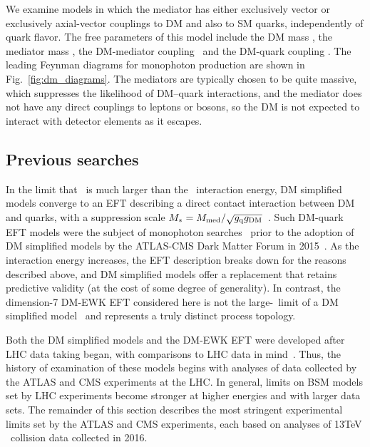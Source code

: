 We examine models in which the mediator has either exclusively vector or exclusively axial-vector couplings to DM and also to SM quarks, independently
of quark flavor. The free parameters of this model include
the DM mass \mdm, the mediator mass \mmed, the DM-mediator coupling \gdm\ and the DM-quark coupling \gq.
The leading Feynman diagrams for monophoton production are shown in Fig.~\ref{fig:dm_diagrams}. The mediators are typically chosen to be quite massive,
which suppresses the likelihood of DM--quark interactions, and the mediator does not have any direct couplings to leptons or bosons,
so the DM is not expected to interact with detector elements as it escapes.

\subsection{Previous searches} \label{sec:introduction_dm_previous_searches}
In the limit that \mmed\ is much larger than the \Pq\Paq\ interaction energy, DM simplified models converge to an EFT describing a direct contact
interaction between DM and quarks, with a suppression scale $M_\mathrm{*} = M_\mathrm{med}/\sqrt{g_\mathrm{q}g_\mathrm{DM}}$~\cite{ref:1603.04156}.
Such DM-quark EFT models were the subject of monophoton searches~\cite{ref:j.physletb.2016.01.057, ref:PhysRevD.91.012008} prior to the adoption of
DM simplified models by the ATLAS-CMS Dark Matter Forum in 2015~\cite{ref:1507.00966}.
As the interaction energy increases, the EFT description breaks down for the reasons described above, and DM simplified models
offer a replacement that retains predictive validity (at the cost of some degree of generality).
In contrast, the dimension-7 DM-EWK EFT considered here is not the large-\mmed\ limit of a DM simplified model~\cite{ref:1507.00966} and represents a truly distinct
process topology.

Both the DM simplified models and the DM-EWK EFT were developed after LHC data taking began, with comparisons to LHC data in mind~\cite{ref:1507.00966, ref:PhysRevD.89.056011}.
Thus, the history of examination of these models begins with analyses of data collected by the ATLAS and CMS experiments at the LHC.
In general, limits on BSM models set by LHC experiments become stronger at higher energies and with larger data sets.
The remainder of this section describes the most stringent experimental limits set by the ATLAS and CMS experiments, each based on analyses of 13\unit{TeV} \Pp\Pp\ collision data
collected in 2016.

